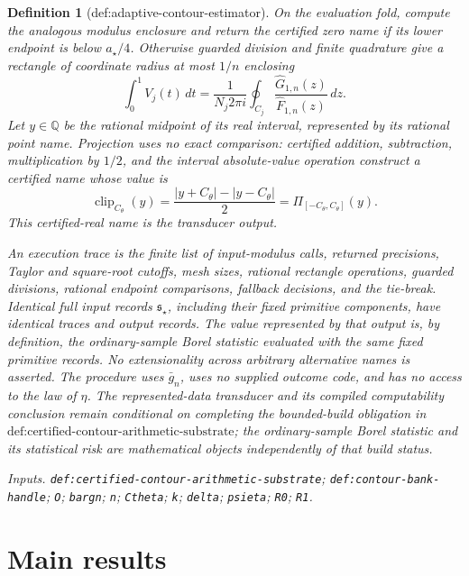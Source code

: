 \documentclass{article}
\newtheorem{definition}{Definition}
\begin{document}
\begin{definition}[def:adaptive-contour-estimator]
On the evaluation fold, compute the analogous modulus enclosure and return the certified zero name if its lower endpoint is below \(a_{\star}/4\).  Otherwise guarded division and finite quadrature give a rectangle of coordinate radius at most \(1/n\) enclosing
\[
 \int_0^1V_j(t)\,dt
 =\frac{1}{N_j2\pi i}\oint_{C_j}
   \frac{\widehat G_{1,n}(z)}{\widehat F_{1,n}(z)}\,dz.
\]
Let \(y\in\mathbb Q\) be the rational midpoint of its real interval, represented by its rational point name.  Projection uses no exact comparison: certified addition, subtraction, multiplication by \(1/2\), and the interval absolute-value operation construct a certified name whose value is
\[
 \operatorname{clip}_{C_{\theta}}(y)
 =\frac{|y+C_{\theta}|-|y-C_{\theta}|}{2}
 =\Pi_{[-C_{\theta},C_{\theta}]}(y).
\]
This certified-real name is the transducer output.

An execution trace is the finite list of input-modulus calls, returned precisions, Taylor and square-root cutoffs, mesh sizes, rational rectangle operations, guarded divisions, rational endpoint comparisons, fallback decisions, and the tie-break.  Identical full input records \(\mathfrak s_{\star}\), including their fixed primitive components, have identical traces and output records.  The value represented by that output is, by definition, the ordinary-sample Borel statistic evaluated with the same fixed primitive records.  No extensionality across arbitrary alternative names is asserted.  The procedure uses \(\bar g_n\), uses no supplied outcome code, and has no access to the law of \(\eta\).  The represented-data transducer and its compiled computability conclusion remain conditional on completing the bounded-build obligation in \(\text{def:certified-contour-arithmetic-substrate}\); the ordinary-sample Borel statistic and its statistical risk are mathematical objects independently of that build status.
\par\smallskip\noindent\emph{Inputs.} \texttt{def:\allowbreak{}certified-\allowbreak{}contour-\allowbreak{}arithmetic-\allowbreak{}substrate}; \texttt{def:\allowbreak{}contour-\allowbreak{}bank-\allowbreak{}handle}; \texttt{O}; \texttt{bargn}; \texttt{n}; \texttt{Ctheta}; \texttt{k}; \texttt{delta}; \texttt{psieta}; \texttt{R0}; \texttt{R1}.
\end{definition}

\section{Main results}
\end{document}
